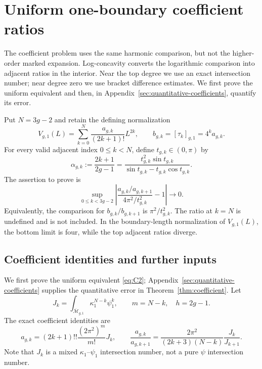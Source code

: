 \section{Uniform one-boundary coefficient ratios}\label{uniform-one-boundary-coefficient-ratios}

The coefficient problem uses the same harmonic comparison, but not the
higher-order marked expansion. Log-concavity converts the logarithmic
comparison into adjacent ratios in the interior. Near the top degree we
use an exact intersection number; near degree zero we use bracket
difference estimates. We first prove the uniform equivalent and then,
in Appendix~\ref{sec:quantitative-coefficients}, quantify its error.

Put \(N=3g-2\) and retain the defining normalization \[
 V_{g,1}(L)=\sum_{k=0}^{N}\frac{a_{g,k}}{(2k+1)!}L^{2k},
 \qquad b_{g,k}=[\tau_k]_{g,1}=4^k a_{g,k}.
\] For every valid adjacent index \(0\le k<N\), define
\(t_{g,k}\in(0,\pi)\) by \begin{equation}
\alpha_{g,k}:=\frac{2k+1}{2g-1}
 =\frac{t_{g,k}^{2}\sin t_{g,k}}
        {\sin t_{g,k}-t_{g,k}\cos t_{g,k}}.
 \label{eq:C1}
\end{equation} The assertion to prove is \begin{equation}
\sup_{0\le k<3g-2}
 \left|\frac{a_{g,k}/a_{g,k+1}}{4\pi^2/t_{g,k}^{2}}-1\right|
 \longrightarrow0.
 \label{eq:C2}
\end{equation} Equivalently, the comparison for \(b_{g,k}/b_{g,k+1}\) is
\(\pi^2/t_{g,k}^2\). The ratio at \(k=N\) is undefined and is not
included. In the boundary-length normalization of \(V_{g,1}(L)\), the bottom limit is
four, while the top adjacent ratios diverge.

\subsection{Coefficient identities and further inputs}\label{exact-dictionary-and-the-inputs-needed-here}

We first prove the uniform equivalent \eqref{eq:C2}; Appendix~\ref{sec:quantitative-coefficients} supplies the quantitative error in Theorem~\ref{thm:coefficient}. Let \[
 J_k=\int_{\overline{\mathcal M}_{g,1}}
       \kappa_1^{N-k}\psi_1^k,
 \qquad m=N-k,\quad h=2g-1.
\] The exact coefficient identities are \begin{equation}
a_{g,k}=(2k+1)!!\frac{(2\pi^2)^m}{m!}J_k,
 \qquad
 \frac{a_{g,k}}{a_{g,k+1}}
 =\frac{2\pi^2}{(2k+3)(N-k)}\frac{J_k}{J_{k+1}}.
 \label{eq:C3}
\end{equation} Note that \(J_k\) is a mixed \(\kappa_1\)--\(\psi_1\)
intersection number, not a pure \(\psi\) intersection number.

